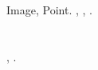 \documentclass[a4paper]{article}
\begin{document}
{
{\CYRD}{\cyra}{\cyrn}{\cyrn}{\cyrery}{\cyre} {\cyro} {\cyrb}{\cyri}{\cyrn}{\cyra}{\cyrr}{\cyrn}{\cyro}{\cyrm}
{\cyri}{\cyrz}{\cyro}{\cyrb}{\cyrr}{\cyra}{\cyrzh}{\cyre}{\cyrn}{\cyri}{\cyri} {\cyri} {\cyre}{\cyrg}{\cyro}
{\cyrs}{\cyrv}{\cyro}{\cyrishrt}{\cyrs}{\cyrt}{\cyrv}{\cyra}{\cyrh}
{\cyrh}{\cyrr}{\cyra}{\cyrn}{\cyrya}{\cyrt}{\cyrs}{\cyrya} {\cyrv} {\cyrk}{\cyrl}{\cyra}{\cyrs}{\cyrs}{\cyre}
\foreignlanguage{english}{Image,
}\foreignlanguage{russian}{{\cyrh}{\cyrr}{\cyra}{\cyrn}{\cyrya}{\cyrshch}{\cyri}{\cyrishrt}
{\cyrb}{\cyri}{\cyrn}{\cyra}{\cyrr}{\cyrn}{\cyro}{\cyre}
{\cyri}{\cyrz}{\cyro}{\cyrb}{\cyrr}{\cyra}{\cyrzh}{\cyre}{\cyrn}{\cyri}{\cyre} {\cyrv}
{\cyrl}{\cyri}{\cyrn}{\cyre}{\cyrishrt}{\cyrn}{\cyro}{\cyrm} {\cyrm}{\cyra}{\cyrs}{\cyrs}{\cyri}{\cyrv}{\cyre}
{\cyro}{\cyrb}{\cyrhrdsn}{\cyre}{\cyrk}{\cyrt}{\cyro}{\cyrv}
}\foreignlanguage{english}{Point}\foreignlanguage{russian}{. {\CYRD}{\cyra}{\cyrn}{\cyrn}{\cyrery}{\cyrishrt}
{\cyrk}{\cyrl}{\cyra}{\cyrs}{\cyrs} {\cyrh}{\cyrr}{\cyra}{\cyrn}{\cyri}{\cyrt}
{\cyrr}{\cyra}{\cyrz}{\cyrr}{\cyre}{\cyrsh}{\cyre}{\cyrn}{\cyri}{\cyre}
{\cyri}{\cyrz}{\cyro}{\cyrb}{\cyrr}{\cyra}{\cyrzh}{\cyre}{\cyrn}{\cyri}{\cyrya},
{\cyrd}{\cyra}{\cyrn}{\cyrn}{\cyrery}{\cyre} {\cyro}
{\cyrk}{\cyro}{\cyrm}{\cyrp}{\cyro}{\cyrn}{\cyre}{\cyrn}{\cyrt}{\cyra}{\cyrh}, {\cyra}
{\cyrt}{\cyra}{\cyrk}{\cyrzh}{\cyre} {\cyrr}{\cyre}{\cyra}{\cyrl}{\cyri}{\cyrz}{\cyru}{\cyre}{\cyrt}
{\cyrm}{\cyre}{\cyrt}{\cyro}{\cyrd}{\cyrery} {\cyrd}{\cyrl}{\cyrya}
{\cyru}{\cyrp}{\cyrr}{\cyra}{\cyrv}{\cyrl}{\cyre}{\cyrn}{\cyri}{\cyrya}
{\cyrp}{\cyri}{\cyrk}{\cyrs}{\cyre}{\cyrl}{\cyrya}{\cyrm}{\cyri} {\cyri}
{\cyrk}{\cyro}{\cyrm}{\cyrp}{\cyro}{\cyrn}{\cyre}{\cyrn}{\cyrt}{\cyra}{\cyrm}{\cyri}
{\cyri}{\cyrz}{\cyro}{\cyrb}{\cyrr}{\cyra}{\cyrzh}{\cyre}{\cyrn}{\cyri}{\cyrya}.}}

\section{{\CYRA}{\cyrl}{\cyrg}{\cyro}{\cyrr}{\cyri}{\cyrt}{\cyrm} {\cyrp}{\cyro}{\cyrm}{\cyre}{\cyrt}{\cyrk}{\cyri}
{\cyrs}{\cyrv}{\cyrya}{\cyrz}{\cyrn}{\cyrery}{\cyrh} {\cyrk}{\cyro}{\cyrm}{\cyrp}{\cyro}{\cyrn}{\cyre}{\cyrn}{\cyrt}
{\cyri}{\cyrz}{\cyro}{\cyrb}{\cyrr}{\cyra}{\cyrzh}{\cyre}{\cyrn}{\cyri}{\cyrya}}
{
{\CYRP}{\cyrr}{\cyro}{\cyrg}{\cyrr}{\cyra}{\cyrm}{\cyrm}{\cyra}
{\cyrr}{\cyre}{\cyra}{\cyrl}{\cyri}{\cyrz}{\cyru}{\cyre}{\cyrt} {\cyrd}{\cyra}{\cyrn}{\cyrn}{\cyrery}{\cyrishrt}
{\cyra}{\cyrl}{\cyrg}{\cyro}{\cyrr}{\cyri}{\cyrt}{\cyrm} {\cyrv} {\cyrv}{\cyri}{\cyrd}{\cyre}
{\cyrt}{\cyrr}{\cyre}{\cyrh} {\cyrc}{\cyri}{\cyrk}{\cyrl}{\cyro}{\cyrv},
{\cyrr}{\cyra}{\cyrs}{\cyrt}{\cyre}{\cyrr}{\cyrn}{\cyro} {\cyrs}{\cyrk}{\cyra}{\cyrn}{\cyri}{\cyrr}{\cyru}{\cyrya}
{\cyrk}{\cyra}{\cyrzh}{\cyrd}{\cyrery}{\cyrishrt} {\cyrp}{\cyri}{\cyrk}{\cyrs}{\cyre}{\cyrl}{\cyrsftsn}
{\cyri}{\cyrz}{\cyro}{\cyrb}{\cyrr}{\cyra}{\cyrzh}{\cyre}{\cyrn}{\cyri}{\cyrya}.}
\end{document}
